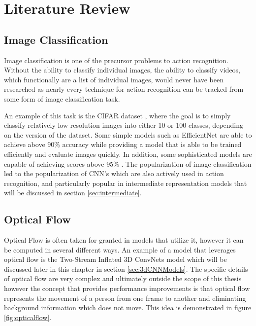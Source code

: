 
\chapter{Literature Review} %

\label{LiteratureReview} %

\section{Image Classification}

Image classification is one of the precursor problems to action recognition. Without the ability to classify individual images, the ability to classify videos, which functionally are a list of individual images, would never have been researched as nearly every technique for action recognition can be tracked from some form of image classification task.

An example of this task is the CIFAR dataset \cite{cifar}, where the goal is to simply classify relatively low resolution images into either 10 or 100 classes, depending on the version of the dataset. Some simple models such as EfficientNet \cite{efficientnet} are able to achieve above 90\% accuracy while providing a model that is able to be trained efficiently and evaluate images quickly. In addition, some sophisticated models are capable of achieving scores above 95\% \cite{cifar100_modern1} \cite{cifar100_modern2}. The popularization of image classification led to the popularization of CNN's which are also actively used in action recognition, and particularly popular in intermediate representation models that will be discussed in section \ref{sec:intermediate}.

\section{Optical Flow}

Optical Flow is often taken for granted in models that utilize it, however it can be computed in several different ways. An example of a model that leverages optical flow is the Two-Stream Inflated 3D ConvNets model \cite{i3d} which will be discussed later in this chapter in section \ref{sec:3dCNNModels}. The specific details of optical flow are very complex and ultimately outside the scope of this thesis however the concept that provides performance improvements is that optical flow represents the movement of a person from one frame to another and eliminating background information which does not move. This idea is demonstrated in figure \ref{fig:opticalflow}.

